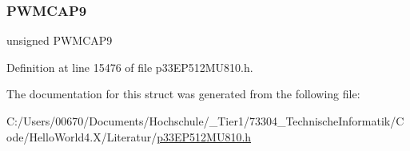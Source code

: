 \mbox{\label{structtag_p_w_m_c_a_p6_b_i_t_s_a9a0cd5d7a58681927adecfd9946b75fb}} 
\subsubsection{\texorpdfstring{P\+W\+M\+C\+A\+P9}{PWMCAP9}}
{\footnotesize\ttfamily unsigned P\+W\+M\+C\+A\+P9}



Definition at line 15476 of file p33\+E\+P512\+M\+U810.\+h.



The documentation for this struct was generated from the following file\+:\begin{DoxyCompactItemize}
\item 
C\+:/\+Users/00670/\+Documents/\+Hochschule/\+\_\+\+Tier1/73304\+\_\+\+Technische\+Informatik/\+Code/\+Hello\+World4.\+X/\+Literatur/\hyperlink{p33_e_p512_m_u810_8h}{p33\+E\+P512\+M\+U810.\+h}\end{DoxyCompactItemize}
